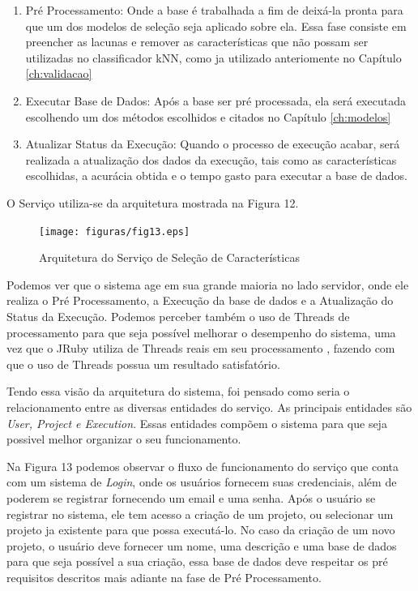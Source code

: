 \begin{enumerate}
	\item{Pré Processamento: Onde a base é trabalhada a fim de deixá-la pronta para que um dos modelos de seleção seja aplicado sobre ela. Essa fase consiste em preencher as lacunas e remover as características que não possam ser utilizadas no classificador kNN, como ja utilizado anteriomente no Capítulo \ref{ch:validacao}}
	\item{Executar Base de Dados: Após a base ser pré processada, ela será executada escolhendo um dos métodos escolhidos e citados no Capítulo \ref{ch:modelos}}
	\item{Atualizar Status da Execução: Quando o processo de execução acabar, será realizada a atualização dos dados da execução, tais como as características escolhidas, a acurácia obtida e o tempo gasto para executar a base de dados.}
\end{enumerate}

O Serviço utiliza-se da arquitetura mostrada na Figura 12.

\begin{figure}[h]
	\centering
		\texttt{[image: figuras/fig13.eps]}
	\caption{Arquitetura do Serviço de Seleção de Características}
	\label{fig:fig13}
\end{figure}

Podemos ver que o sistema age em sua grande maioria no lado servidor, onde ele realiza o Pré Processamento, a Execução da base de dados e a Atualização do Status da Execução. Podemos perceber também o uso de Threads de processamento para que seja possível melhorar o desempenho do sistema, uma vez que o JRuby utiliza de Threads reais em seu processamento \cite{jruby}, fazendo com que o uso de Threads possua um resultado satisfatório.

Tendo essa visão da arquitetura do sistema, foi pensado como seria o relacionamento entre as diversas entidades do serviço. As principais entidades são \textit{User, Project e Execution}. Essas entidades compõem o sistema para que seja possivel melhor organizar o seu funcionamento. 


Na Figura 13 podemos observar o fluxo de funcionamento do serviço que conta com um sistema de \textit{Login}, onde os usuários fornecem suas credenciais, além de poderem se registrar fornecendo um email e uma senha. Após o usuário se registrar no sistema, ele tem acesso a criação de um projeto, ou selecionar um projeto ja existente para que possa executá-lo. No caso da criação de um novo projeto, o usuário deve fornecer um nome, uma descrição e uma base de dados para que seja possível a sua criação, essa base de dados deve respeitar os pré requisitos descritos mais adiante na fase de Pré Processamento.

